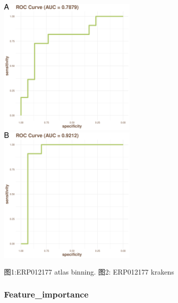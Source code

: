 \documentclass[
]{article}
\begin{document}
\includegraphics[width=0.5\textwidth,height=0.5\textheight]{../../Analysis_shotgun_ERP012177/03_ML/shotgun/atlas_binning/ERP012177_binning_best.model_draw_Roc_plot.png}
\includegraphics[width=0.5\textwidth,height=0.5\textheight]{../../Analysis_shotgun_ERP012177/03_ML/shotgun/krakens/ERP012177_best.model_draw_Roc_plot.png}

图1:ERP012177 atlas binning. 图2: ERP012177 krakens

\hypertarget{feature_importance}{%
\subsubsection{Feature\_importance}\label{feature_importance}}
\end{document}
